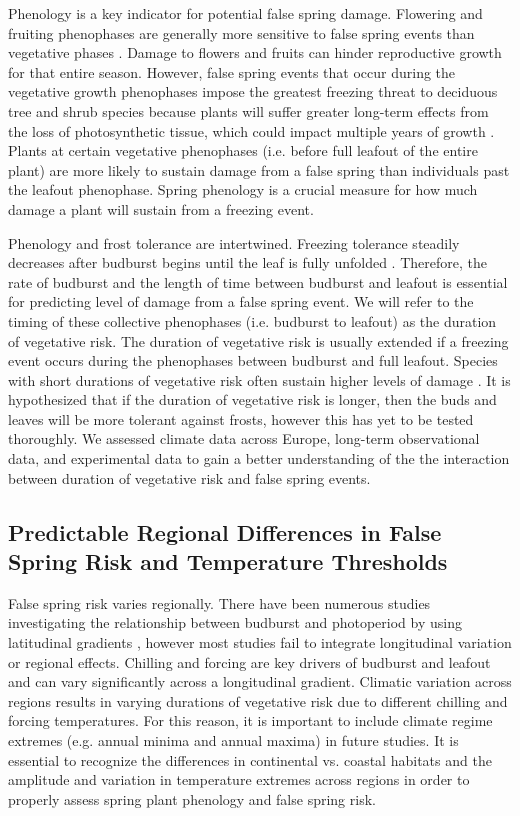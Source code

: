 \documentclass{article}\usepackage[]{graphicx}\usepackage[]{color}
\begin{document}
Phenology is a key indicator for potential false spring damage. Flowering and fruiting phenophases are generally more sensitive to false spring events than vegetative phases \citep{Augspurger2009, Lenz2013}. Damage to flowers and fruits can hinder reproductive growth for that entire season. However, false spring events that occur during the vegetative growth phenophases impose the greatest freezing threat to deciduous tree and shrub species because plants will suffer greater long-term effects from the loss of photosynthetic tissue, which could impact multiple years of growth \citep{Sakai1987}. Plants at certain vegetative phenophases (i.e. before full leafout of the entire plant) are more likely to sustain damage from a false spring than individuals past the leafout phenophase. Spring phenology is a crucial measure for how much damage a plant will sustain from a freezing event.

Phenology and frost tolerance are intertwined. Freezing tolerance steadily decreases after budburst begins until the leaf is fully unfolded \citep{Lenz2016}. Therefore, the rate of budburst and the length of time between budburst and leafout is essential for predicting level of damage from a false spring event. We will refer to the timing of these collective phenophases (i.e. budburst to leafout) as the duration of vegetative risk. The duration of vegetative risk is usually extended if a freezing event occurs during the phenophases between budburst and full leafout. Species with short durations of vegetative risk often sustain higher levels of damage \citep {Augspurger2009}. It is hypothesized that if the duration of vegetative risk is longer, then the buds and leaves will be more tolerant against frosts, however this has yet to be tested thoroughly. We assessed climate data across Europe, long-term observational data, and experimental data to gain a better understanding of the the interaction between duration of vegetative risk and false spring events.  

\subsection {Predictable Regional Differences in False Spring Risk and Temperature Thresholds}
False spring risk varies regionally. There have been numerous studies investigating the relationship between budburst and photoperiod by using latitudinal gradients \citep{Partanen2004, Viheraaarnio2006, Caffarra2011, Zohner2016, Gauzere2017}, however most studies fail to integrate longitudinal variation or regional effects. Chilling and forcing are key drivers of budburst and leafout and can vary significantly across a longitudinal gradient. Climatic variation across regions results in varying durations of vegetative risk due to different chilling and forcing temperatures. For this reason, it is important to include climate regime extremes (e.g. annual minima and annual maxima) in future studies. It is essential to recognize the differences in continental vs. coastal habitats and the amplitude and variation in temperature extremes across regions in order to properly assess spring plant phenology and false spring risk. 
\end{document}

